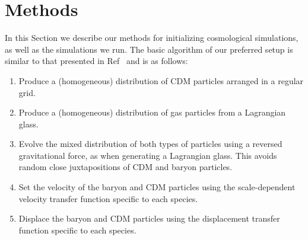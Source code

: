 \documentclass[a4paper,11pt]{article}
\begin{document}
%
%


\section{Methods}
\label{sec:methods}

In this Section we describe our methods for initializing cosmological simulations, as well as the simulations we run.
The basic algorithm of our preferred setup is similar to that presented in Ref~\cite{Yoshida:2003} and is as follows:
\begin{enumerate}
 \item Produce a (homogeneous) distribution of CDM particles arranged in a regular grid.
 \item Produce a (homogeneous) distribution of gas particles from a Lagrangian glass.
 \item Evolve the mixed distribution of both types of particles using a reversed gravitational force, as when generating a Lagrangian glass. This avoids random close juxtapositions of CDM and baryon particles.
 \item Set the velocity of the baryon and CDM particles using the scale-dependent velocity transfer function specific to each species.
  \item Displace the baryon and CDM particles using the displacement transfer function specific to each species.
\end{enumerate}
\end{document}
